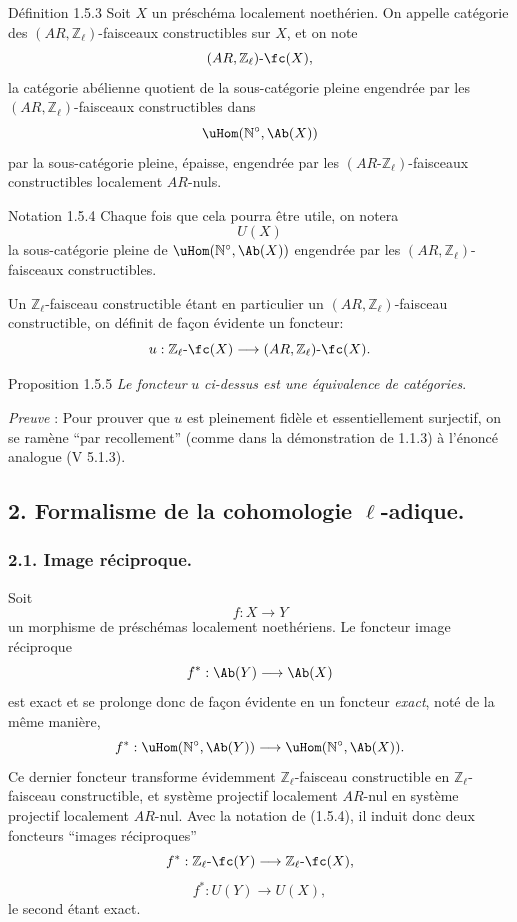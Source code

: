 \begin{statement}{Définition 1.5.3}
Soit \(X\) un préschéma localement noethérien. On appelle catégorie des \((AR,\mathbb{Z}_\ell)\)-faisceaux constructibles sur \(X\), et on note
\[
(AR,\mathbb{Z}_\ell)\text{-}\fc(X),
\]
la
catégorie abélienne quotient de la sous-catégorie pleine engendrée par les \((AR,\mathbb{Z}_\ell)\)-faisceaux constructibles dans
\[
\uHom(\mathbb{N}^\circ,\Ab(X))
\]
par la sous-catégorie pleine, épaisse, engendrée par les \((AR\text{-}\mathbb{Z}_\ell)\)-faisceaux constructibles localement \(AR\)-nuls.
\end{statement}

\begin{statement}{Notation 1.5.4}
Chaque fois que cela pourra être utile, on notera
\[
U(X)
\]
la sous-catégorie pleine de \(\uHom(\mathbb{N}^\circ,\Ab(X))\) engendrée par les \((AR,\mathbb{Z}_\ell)\)-faisceaux constructibles.
\end{statement}

Un \(\mathbb{Z}_\ell\)-faisceau constructible étant en particulier un \((AR,\mathbb{Z}_\ell)\)-faisceau constructible, on définit de façon évidente un foncteur:
\[
u:\mathbb{Z}_\ell\text{-}\fc(X)\longrightarrow (AR,\mathbb{Z}_\ell)\text{-}\fc(X).
\]

\begin{statement}{Proposition 1.5.5}
\emph{Le foncteur} \(u\) \emph{ci-dessus est une équivalence de catégories}.
\end{statement}

\emph{Preuve} : Pour prouver que \(u\) est pleinement fidèle et essentiellement surjectif, on se ramène ``par recollement'' (comme dans la démonstration de 1.1.3) à l'énoncé analogue (V 5.1.3).

\subsection*{2. Formalisme de la cohomologie \(\ell\)-adique.}

\subsubsection*{2.1. Image réciproque.}

Soit
\[
f:X\longrightarrow Y
\]
un morphisme de préschémas localement noethériens. Le foncteur image réciproque
\[
f^*:\Ab(Y)\longrightarrow \Ab(X)
\]
est exact et se prolonge donc de façon évidente en un foncteur \emph{exact}, noté de la même manière,
\[
f^*:\uHom(\mathbb{N}^\circ,\Ab(Y))\longrightarrow \uHom(\mathbb{N}^\circ,\Ab(X)).
\]
Ce dernier foncteur transforme évidemment \(\mathbb{Z}_\ell\)-faisceau constructible en \(\mathbb{Z}_\ell\)-faisceau constructible, et système projectif localement \(AR\)-nul en système projectif localement \(AR\)-nul. Avec la notation de (1.5.4), il induit donc deux foncteurs ``images réciproques''
\[
f^*:\mathbb{Z}_\ell\text{-}\fc(Y)\longrightarrow \mathbb{Z}_\ell\text{-}\fc(X),
\]
\[
f^*:U(Y)\longrightarrow U(X),
\]
le second étant exact.

